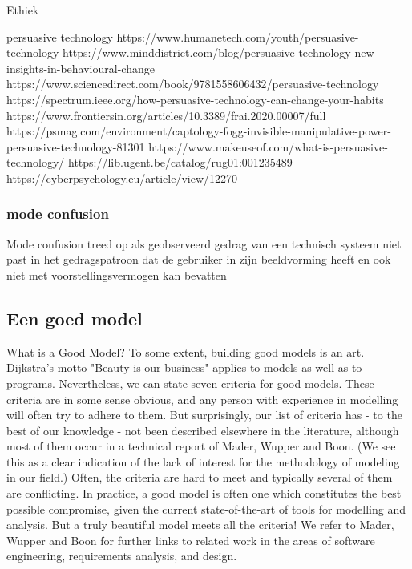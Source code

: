  
Ethiek 



persuasive technology 
https://www.humanetech.com/youth/persuasive-technology 
https://www.minddistrict.com/blog/persuasive-technology-new-insights-in-behavioural-change 
https://www.sciencedirect.com/book/9781558606432/persuasive-technology 
https://spectrum.ieee.org/how-persuasive-technology-can-change-your-habits 
https://www.frontiersin.org/articles/10.3389/frai.2020.00007/full 
https://psmag.com/environment/captology-fogg-invisible-manipulative-power-persuasive-technology-81301 
https://www.makeuseof.com/what-is-persuasive-technology/ 
https://lib.ugent.be/catalog/rug01:001235489 
https://cyberpsychology.eu/article/view/12270 


\subsubsection{mode confusion }
Mode confusion treed op als geobserveerd gedrag van een technisch systeem niet past in het gedragspatroon 
dat de gebruiker in zijn beeldvorming heeft en ook niet met voorstellingsvermogen kan bevatten 


\subsection{Een goed model}

What is a Good Model?
To some extent, building good models is an art. Dijkstra's motto "Beauty is our business" applies to models as well as to programs. Nevertheless, we can state seven criteria for good models. These criteria are in some sense obvious, and any person with experience in modelling will often try to adhere to them. But surprisingly, our list of criteria has - to the best of our knowledge - not been described elsewhere in the literature, although most of them occur in a technical report of Mader, Wupper and Boon. (We see this as a clear indication of the lack of interest for the methodology of modeling in our field.) Often, the criteria are hard to meet and typically several of them are conflicting. In practice, a good model is often one which constitutes the best possible compromise, given the current state-of-the-art of tools for modelling and analysis. But a truly beautiful model meets all the criteria! We refer to Mader, Wupper and Boon for further links to related work in the areas of software engineering, requirements analysis, and design.

